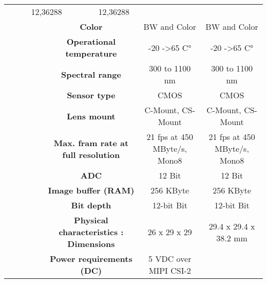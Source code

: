 \begin{table}[H]
{\begin{tabular}{ccc|cc|cc|}
  \multicolumn{2}{c|}{12,36288} &
  \multicolumn{2}{c|}{12,36288} \\
\multicolumn{1}{|c|}{} &
  \multicolumn{2}{c|}{\cellcolor[HTML]{EFEFEF}\textbf{Color}} &
  \multicolumn{2}{c|}{\cellcolor[HTML]{EFEFEF}BW and Color} &
  \multicolumn{2}{c|}{\cellcolor[HTML]{EFEFEF}BW and Color} \\
\multicolumn{1}{|c|}{} &
  \multicolumn{2}{c|}{\textbf{Operational temperature}} &
  \multicolumn{2}{c|}{-20 -\textgreater 65 C°} &
  \multicolumn{2}{c|}{-20 -\textgreater 65 C°} \\
\multicolumn{1}{|c|}{} &
  \multicolumn{2}{c|}{\cellcolor[HTML]{EFEFEF}\textbf{Spectral range}} &
  \multicolumn{2}{c|}{\cellcolor[HTML]{EFEFEF}300 to 1100 nm} &
  \multicolumn{2}{c|}{\cellcolor[HTML]{EFEFEF}300 to 1100 nm} \\
\multicolumn{1}{|c|}{} &
  \multicolumn{2}{c|}{\textbf{Sensor type}} &
  \multicolumn{2}{c|}{CMOS} &
  \multicolumn{2}{c|}{CMOS} \\
\multicolumn{1}{|c|}{} &
  \multicolumn{2}{c|}{\cellcolor[HTML]{EFEFEF}\textbf{Lens mount}} &
  \multicolumn{2}{c|}{\cellcolor[HTML]{EFEFEF}C-Mount, CS-Mount} &
  \multicolumn{2}{c|}{\cellcolor[HTML]{EFEFEF}C-Mount, CS-Mount} \\
\multicolumn{1}{|c|}{} &
  \multicolumn{2}{c|}{\textbf{Max. fram rate at full resolution}} &
  \multicolumn{2}{c|}{21 fps at 450 MByte/s, Mono8} &
  \multicolumn{2}{c|}{21 fps at 450 MByte/s, Mono8} \\
\multicolumn{1}{|c|}{} &
  \multicolumn{2}{c|}{\cellcolor[HTML]{EFEFEF}\textbf{ADC}} &
  \multicolumn{2}{c|}{\cellcolor[HTML]{EFEFEF}12 Bit} &
  \multicolumn{2}{c|}{\cellcolor[HTML]{EFEFEF}12 Bit} \\
\multicolumn{1}{|c|}{} &
  \multicolumn{2}{c|}{\textbf{Image buffer (RAM)}} &
  \multicolumn{2}{c|}{256 KByte} &
  \multicolumn{2}{c|}{256 KByte} \\
\multicolumn{1}{|c|}{} &
  \multicolumn{2}{c|}{\cellcolor[HTML]{EFEFEF}\textbf{Bit depth}} &
  \multicolumn{2}{c|}{\cellcolor[HTML]{EFEFEF}12-bit Bit} &
  \multicolumn{2}{c|}{\cellcolor[HTML]{EFEFEF}12-bit Bit} \\
\multicolumn{1}{|c|}{} &
  \multicolumn{2}{c|}{\textbf{Physical characteristics : Dimensions}} &
  \multicolumn{2}{c|}{26 x 29 x 29} &
  \multicolumn{2}{c|}{29.4 x 29.4 x 38.2 mm} \\
\multicolumn{1}{|c|}{} &
  \multicolumn{2}{c|}{\cellcolor[HTML]{EFEFEF}\textbf{Power requirements (DC)}} &
  \multicolumn{2}{c|}{\cellcolor[HTML]{EFEFEF}5 VDC over MIPI CSI-2} &

\end{tabular}}
\end{table}
